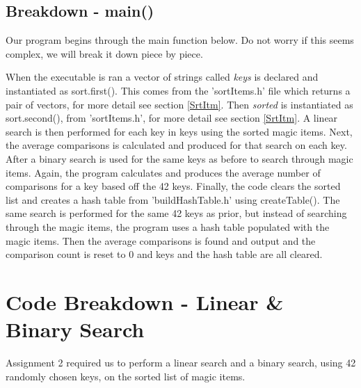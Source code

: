 \documentclass[12pt, letterpaper]{article}
\begin{document}
\subsection{Breakdown - main()} \label{Main}
Our program begins through the main function below.
Do not worry if this seems complex, we will break it down piece by piece.

When the executable is ran a vector of strings called \textit{keys} is declared and instantiated as sort.first().
This comes from the 'sortItems.h' file which returns a pair of vectors, for more detail see section \ref{SrtItm}.
Then \textit{sorted} is instantiated as sort.second(), from 'sortItems.h', for more detail see section \ref{SrtItm}.
\newline
\indent A linear search is then performed for each key in keys using the sorted magic items.
Next, the average comparisons is calculated and produced for that search on each key.
After a binary search is used for the same keys as before to search through magic items.
Again, the program calculates and produces the average number of comparisons for a key based off the 42 keys.
\newline
\indent Finally, the code clears the sorted list and creates a hash table from 'buildHashTable.h' using createTable().
The same search is performed for the same 42 keys as prior, but instead of searching through the magic items, the program uses a hash table populated with the magic items.
Then the average comparisons is found and output and the comparison count is reset to 0 and keys and the hash table are all cleared.

\section{Code Breakdown - Linear \& Binary Search}
Assignment 2 required us to perform a linear search and a binary search, using 42 randomly chosen keys, on the sorted list of magic items.
\end{document}
